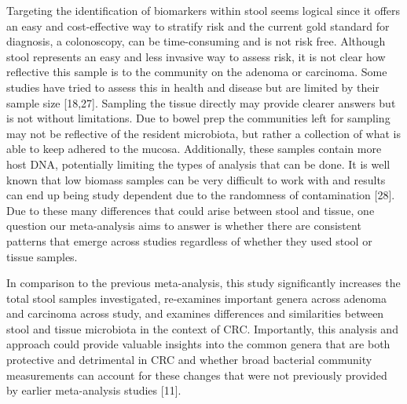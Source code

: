 \documentclass[12pt,]{article}
\begin{document}
Targeting the identification of biomarkers within stool seems logical
since it offers an easy and cost-effective way to stratify risk and the
current gold standard for diagnosis, a colonoscopy, can be
time-consuming and is not risk free. Although stool represents an easy
and less invasive way to assess risk, it is not clear how reflective
this sample is to the community on the adenoma or carcinoma. Some
studies have tried to assess this in health and disease but are limited
by their sample size {[}18,27{]}. Sampling the tissue directly may
provide clearer answers but is not without limitations. Due to bowel
prep the communities left for sampling may not be reflective of the
resident microbiota, but rather a collection of what is able to keep
adhered to the mucosa. Additionally, these samples contain more host
DNA, potentially limiting the types of analysis that can be done. It is
well known that low biomass samples can be very difficult to work with
and results can end up being study dependent due to the randomness of
contamination {[}28{]}. Due to these many differences that could arise
between stool and tissue, one question our meta-analysis aims to answer
is whether there are consistent patterns that emerge across studies
regardless of whether they used stool or tissue samples.

In comparison to the previous meta-analysis, this study significantly
increases the total stool samples investigated, re-examines important
genera across adenoma and carcinoma across study, and examines
differences and similarities between stool and tissue microbiota in the
context of CRC. Importantly, this analysis and approach could provide
valuable insights into the common genera that are both protective and
detrimental in CRC and whether broad bacterial community measurements
can account for these changes that were not previously provided by
earlier meta-analysis studies {[}11{]}.
\end{document}
